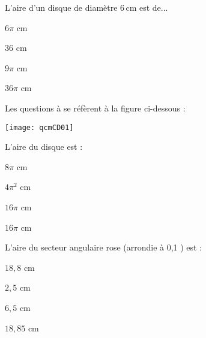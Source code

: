 
\begin{QCM}
\begin{GroupeQCM}

\begin{exercice}
L'aire d'un disque de diamètre 6\,cm est de...
\begin{ChoixQCM}{4}
\item $6\pi$ cm
\item $36$ cm
\item $9\pi$ cm
\item $36\pi$ cm
\end{ChoixQCM}

\begin{corrige}
\end{corrige}
\end{exercice}

\begin{EnonceCommunQCM}
Les questions  à  se réfèrent à la figure ci-dessous :
\end{EnonceCommunQCM}

\begin{center}
    \texttt{[image: qcmCD01]}
\end{center}

\begin{exercice}\label{CDqcmA}
L'aire du disque est :
\begin{ChoixQCM}{4}
\item $8\pi$ cm
\item $4\pi^2$ cm
\item $16\pi$ cm
\item $16\pi$ cm
\end{ChoixQCM}

\begin{corrige}
\end{corrige}
\end{exercice}



\begin{exercice}
L'aire du secteur angulaire rose (arrondie à 0,1 ) est :
\begin{ChoixQCM}{4}
\item $18,8$ cm
\item $2,5$ cm
\item $6,5$ cm
\item $18,85$ cm
\end{ChoixQCM}


\end{exercice}
\end{GroupeQCM}
\end{QCM}

